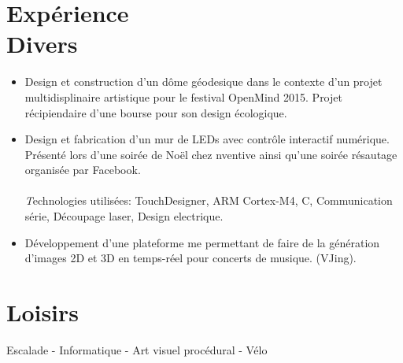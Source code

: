 \documentclass[margin,line]{res}
\begin{document}
\begin{resume}
  \section{\sc Expérience\\ Divers}
  \begin{itemize}
    \item Design et construction d'un dôme géodesique dans le contexte d'un projet multidisplinaire artistique pour le festival OpenMind 2015. Projet récipiendaire d'une bourse pour son design écologique.
    \item Design et fabrication d'un mur de LEDs avec contrôle interactif numérique. Présenté lors d'une soirée de Noël chez nventive ainsi qu'une soirée résautage organisée par Facebook.
          \\\\{\emph Technologies utilisées:} TouchDesigner, ARM Cortex-M4, C, Communication série, Découpage laser, Design electrique.
    \item Développement d'une plateforme me permettant de faire de la génération d'images 2D et 3D en temps-réel pour concerts de musique. (VJing).
  \end{itemize}


  \section{\sc Loisirs}
  Escalade -  Informatique - Art visuel procédural - Vélo


\end{resume}
\end{document}
